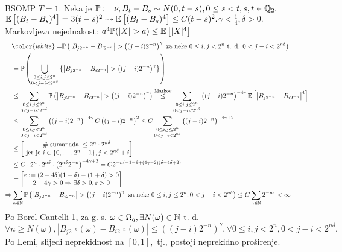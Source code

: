\documentclass{article}
\begin{document}
BSOMP \(T=1.\) Neka je \(\Bbb P:=\nu, B_t-B_s\sim  N(0,t-s),0\le s<t,s,t\in\Bbb Q_2.\)\newline \(\Bbb E\left[(B_t-B_s)^4\right]=3(t-s)^2\leadsto\Bbb E\left[(B_t-B_s)^4\right]\le C(t-s)^2.\)\newline \(\gamma<\frac14,\delta>0.\) Markovljeva nejednakost: \(a^4\Bbb P(|X|>a)\le\Bbb E\left[|X|^4\right]\) \[\begin{aligned}{}&{\color{white}=}\Bbb P\left(\left|B_{j2^{-n}}-B_{i2^{-n}}\right|>\left((j-i)2^{-n}\right)^\gamma\text{ za neke }0\le i,j<2^n\text{ t. d. }0<j-i<2^{n\delta}\right)\\&=\Bbb P\left(\bigcup_{\substack{0\le i,j\le 2^n\\0<j-i<2^{n\delta}}}\left\{\left|B_{j2^{-n}}-B_{i2^{-n}}\right|>\left((j-i)2^{-n}\right)^\gamma\right\}\right)\\&\le\sum_{\substack{0\le i,j\le 2^n\\0<j-i<2^{n\delta}}}\Bbb P\left(\left|B_{j2^{-n}}-B_{i2^{-n}}\right|>\left((j-i)2^{-n}\right)^\gamma\right)\overset{\text{Markov}}{\le}\sum_{\substack{0\le i,j\le 2^n\\0<j-i<2^{n\delta}}}\left((j-i)2^{-n}\right)^{-4\gamma}\Bbb E\left[\left|B_{j2^{-n}}-B_{i2^{-n}}\right|^4\right]\\&\le\sum_{\substack{0\le i,j<2^n\\0<j-i<2^{n\delta}}}\left((j-i)2^{-n}\right)^{-4\gamma}C\left((j-i)2^{-n}\right)^2\le C\sum_{\substack{0\le i,j\le 2^n\\0<j-i<2^{n\delta}}}\left((j-i)2^{-n}\right)^{-4\gamma+2}\\&\le\begin{bmatrix}\#\text{ sumanada }\le 2^n\cdot 2^{n\delta}\\\text{ jer je }i\in\{0,\ldots,2^n-1\},j<2^{n\delta}+i\end{bmatrix}\\&\le C\cdot 2^n\cdot 2^{n\delta}\cdot\left(2^{n\delta}2^{-n}\right)^{-4\gamma+2}=C2^{-n(-1-\delta+(4\gamma-2))\delta-4\delta+2)}\\&=\begin{bmatrix}\varepsilon:=(2-4\delta)(1-\delta)-(1+\delta)>0\\2-4\gamma>0\Rightarrow\exists\delta>0,\varepsilon>0\end{bmatrix}\\\Rightarrow&\sum_{n\in\Bbb N}\Bbb P\left(\left|B_{j2^{-n}}-B_{i2^{-n}}\right|>\left((j-i)2^{-n}\right)^\gamma\text{ za neke }0\le i,j\le 2^n,0<j-i<2^{n\delta}\right)\le C\sum_{n\in\Bbb N}2^{-n\varepsilon}<\infty\end{aligned}\] Po Borel-Cantelli 1, za g. s. \(\omega\in\Omega_q,\exists N(\omega)\in\Bbb N\) t. d.  \[\forall n\ge N(\omega),\left|B_{j2^{-n}}(\omega)-B_{i2^{-n}}(\omega)\right|\le \left((j-i)2^{-n}\right)^\gamma,\forall 0\le i,j<2^n,0<j-i<2^{n\delta}.\] Po Lemi, slijedi neprekidnost na \([0,1],\) tj., postoji neprekidno proširenje.\newline\newline 
\end{document}
